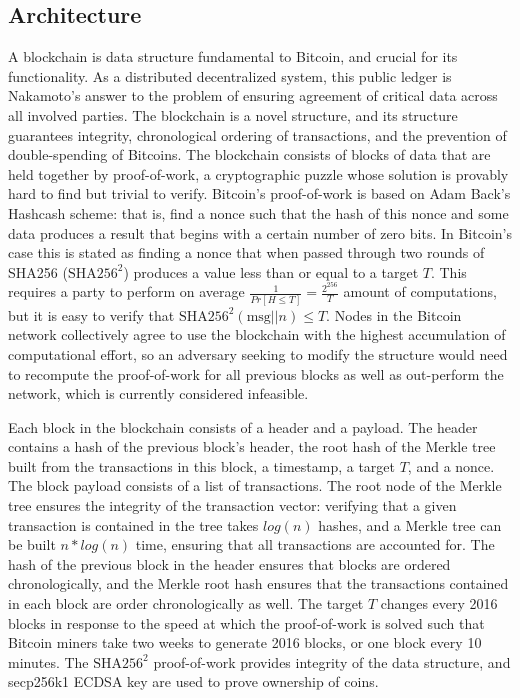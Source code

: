 \subsection{Architecture}

A blockchain is data structure fundamental to Bitcoin, and crucial for its functionality. As a distributed decentralized system, this public ledger is Nakamoto's answer to the problem of ensuring agreement of critical data across all involved parties. The blockchain is a novel structure, and its structure guarantees integrity, chronological ordering of transactions, and the prevention of double-spending of Bitcoins. The blockchain consists of blocks of data that are held together by proof-of-work, a cryptographic puzzle whose solution is provably hard to find but trivial to verify. Bitcoin's proof-of-work is based on Adam Back's Hashcash scheme: that is, find a nonce such that the hash of this nonce and some data produces a result that begins with a certain number of zero bits. In Bitcoin's case this is stated as finding a nonce that when passed through two rounds of SHA256 ($ \textrm{SHA}256^{{2}} $) produces a value less than or equal to a target $ T $. This requires a party to perform on average $ \frac{1}{Pr[H \leq T]} = \frac{2 ^ {{256}}}{T} $ amount of computations, but it is easy to verify that $ \textrm{SHA}256^{{2}}(\textrm{msg} || n) \leq T $. Nodes in the Bitcoin network collectively agree to use the blockchain with the highest accumulation of computational effort, so an adversary seeking to modify the structure would need to recompute the proof-of-work for all previous blocks as well as out-perform the network, which is currently considered infeasible.\cite{Okupski2014}

Each block in the blockchain consists of a header and a payload. The header contains a hash of the previous block's header, the root hash of the Merkle tree built from the transactions in this block, a timestamp, a target $ T $, and a nonce. The block payload consists of a list of transactions. The root node of the Merkle tree ensures the integrity of the transaction vector: verifying that a given transaction is contained in the tree takes $ log(n) $ hashes, and a Merkle tree can be built $ n * log(n) $ time, ensuring that all transactions are accounted for. The hash of the previous block in the header ensures that blocks are ordered chronologically, and the Merkle root hash ensures that the transactions contained in each block are order chronologically as well. The target $ T $ changes every 2016 blocks in response to the speed at which the proof-of-work is solved such that Bitcoin miners take two weeks to generate 2016 blocks, or one block every 10 minutes. The $ \textrm{SHA}256^{{2}} $ proof-of-work provides integrity of the data structure, and secp256k1 ECDSA key are used to prove ownership of coins.\cite{Okupski2014}

